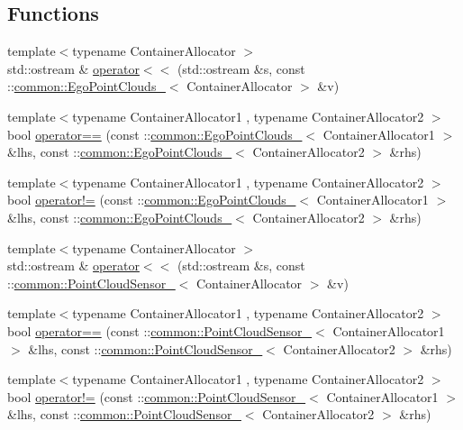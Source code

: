 \subsection*{Functions}
\begin{DoxyCompactItemize}
\item 
{\footnotesize template$<$typename Container\+Allocator $>$ }\\std\+::ostream \& \hyperlink{namespacecommon_ab88da1e27722dfe7cfc22f6106e01016}{operator$<$$<$} (std\+::ostream \&s, const \+::\hyperlink{structcommon_1_1EgoPointClouds__}{common\+::\+Ego\+Point\+Clouds\+\_\+}$<$ Container\+Allocator $>$ \&v)
\item 
{\footnotesize template$<$typename Container\+Allocator1 , typename Container\+Allocator2 $>$ }\\bool \hyperlink{namespacecommon_af4bbfa6ad580ed64356a91d0f46fd59a}{operator==} (const \+::\hyperlink{structcommon_1_1EgoPointClouds__}{common\+::\+Ego\+Point\+Clouds\+\_\+}$<$ Container\+Allocator1 $>$ \&lhs, const \+::\hyperlink{structcommon_1_1EgoPointClouds__}{common\+::\+Ego\+Point\+Clouds\+\_\+}$<$ Container\+Allocator2 $>$ \&rhs)
\item 
{\footnotesize template$<$typename Container\+Allocator1 , typename Container\+Allocator2 $>$ }\\bool \hyperlink{namespacecommon_afd4a49a0e5d3d1823ae5842fa54a7466}{operator!=} (const \+::\hyperlink{structcommon_1_1EgoPointClouds__}{common\+::\+Ego\+Point\+Clouds\+\_\+}$<$ Container\+Allocator1 $>$ \&lhs, const \+::\hyperlink{structcommon_1_1EgoPointClouds__}{common\+::\+Ego\+Point\+Clouds\+\_\+}$<$ Container\+Allocator2 $>$ \&rhs)
\item 
{\footnotesize template$<$typename Container\+Allocator $>$ }\\std\+::ostream \& \hyperlink{namespacecommon_a8fbe91682ecab877102fddadf0793d6e}{operator$<$$<$} (std\+::ostream \&s, const \+::\hyperlink{structcommon_1_1PointCloudSensor__}{common\+::\+Point\+Cloud\+Sensor\+\_\+}$<$ Container\+Allocator $>$ \&v)
\item 
{\footnotesize template$<$typename Container\+Allocator1 , typename Container\+Allocator2 $>$ }\\bool \hyperlink{namespacecommon_a7c09f723fcbe2e36f39855e3b7ece998}{operator==} (const \+::\hyperlink{structcommon_1_1PointCloudSensor__}{common\+::\+Point\+Cloud\+Sensor\+\_\+}$<$ Container\+Allocator1 $>$ \&lhs, const \+::\hyperlink{structcommon_1_1PointCloudSensor__}{common\+::\+Point\+Cloud\+Sensor\+\_\+}$<$ Container\+Allocator2 $>$ \&rhs)
\item 
{\footnotesize template$<$typename Container\+Allocator1 , typename Container\+Allocator2 $>$ }\\bool \hyperlink{namespacecommon_ab204ea7eb40246b726341e9d9ed63520}{operator!=} (const \+::\hyperlink{structcommon_1_1PointCloudSensor__}{common\+::\+Point\+Cloud\+Sensor\+\_\+}$<$ Container\+Allocator1 $>$ \&lhs, const \+::\hyperlink{structcommon_1_1PointCloudSensor__}{common\+::\+Point\+Cloud\+Sensor\+\_\+}$<$ Container\+Allocator2 $>$ \&rhs)
\end{DoxyCompactItemize}


